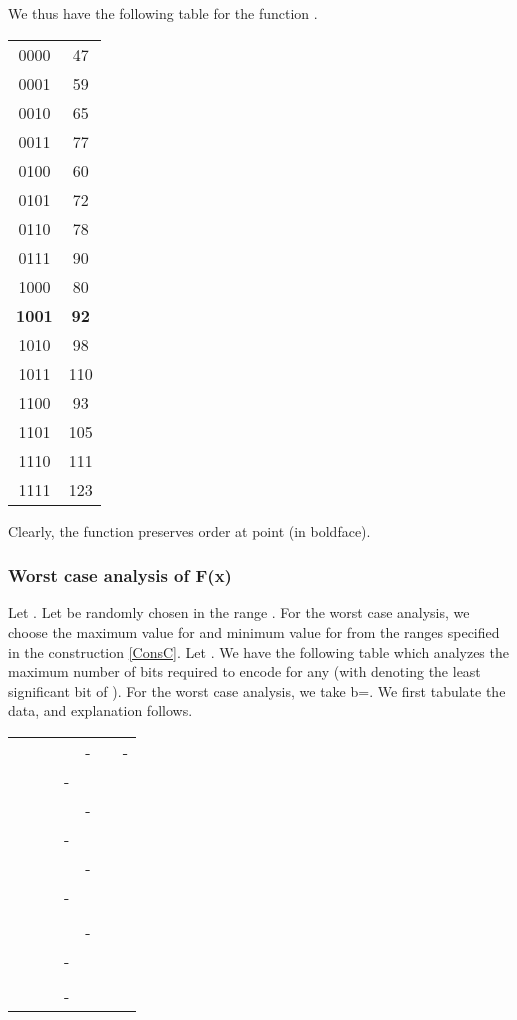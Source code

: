 \documentclass[11pt, letterpaper, romanappendices, onecolumn]{article}
\theoremstyle{plain}\newtheorem{thm}{Theorem}[section]
\theoremstyle{definition}
\theoremstyle{remark}
\begin{document}
\par We thus have the following table for the function .
\begin{center}
\begin{tabular}{|c|c|}
\hline 
 &  \\ 
\hline 
0000 & 47 \\ 
\hline 
0001 & 59 \\ 
\hline 
0010 & 65 \\ 
\hline 
0011 & 77 \\ 
\hline 
0100 & 60 \\ 
\hline 
0101 & 72 \\ 
\hline 
0110 & 78 \\ 
\hline 
0111 & 90 \\ 
\hline 
1000 & 80 \\ 
\hline 
\textbf{1001} &\textbf{ 92} \\ 
\hline 
1010 & 98 \\ 
\hline 
1011 & 110 \\ 
\hline 
1100 & 93 \\ 
\hline 
1101 & 105 \\ 
\hline 
1110 & 111 \\ 
\hline 
1111 & 123 \\ 
\hline 
\end{tabular}
\end{center}
Clearly, the function  preserves order at point  (in boldface). 

\subsubsection{Worst case analysis of F(x)}
\par  Let . Let  be randomly chosen in the range . For the worst case analysis, we choose the maximum value for   and minimum value for   from the ranges specified in the construction \ref{ConsC}. Let . We have the following table which analyzes the maximum number of bits required to encode  for any  (with  denoting the  least significant bit of ). For the worst case analysis, we take b=. We first tabulate the data, and explanation follows.
\begin{center}
\begin{tabular}{|c|c|c|c|c|c|c|}\hline
  &  &  &  &  &  &  \\\hline 
  &  &  &  & - &  & - \\\hline 
  &  &  & - &  &  &  \\\hline 
  &  &  &  & - &  &  \\\hline 
  &  &  & - &  &  &  \\\hline 
  &  &  &  & - &  &  \\\hline 
  &  &  & - &  &  &  \\\hline 
  &  &  &  &  &  &  \\\hline 
  &  &  &  & - &  &  \\\hline 
  &  &  & - &  &  &  \\\hline 
  &  &  &  &  &  &  \\\hline 
  &  &  & - &  &  &  \\\hline 
\end{tabular}
\end{center}
\end{document}
